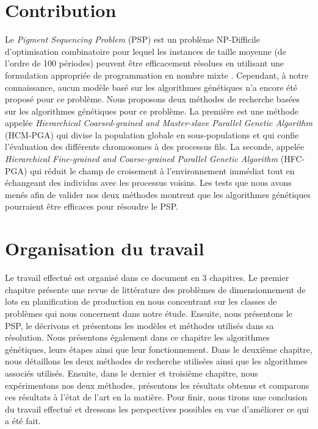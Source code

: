 	\section*{Contribution}
	Le \emph{Pigment Sequencing Problem} (PSP) est un problème NP-Difficile d'optimisation combinatoire pour lequel les instances de taille moyenne (de l'ordre de 100 périodes) peuvent être efficacement résolues en utilisant une formulation appropriée de programmation en nombre mixte \cite{pochet_wolsey}. Cependant, à notre connaissance, aucun modèle basé sur les algorithmes génétiques n'a encore été proposé pour ce problème. Nous proposons deux méthodes de recherche basées sur les algorithmes génétiques pour ce problème. La première est une méthode appelée \emph{Hierarchical Coarsed-grained and Master-slave Parallel Genetic Algorithm} (HCM-PGA) qui divise la population globale en sous-populations et qui confie l'évaluation des différents chromosomes à des processus fils. La seconde, appelée \emph{Hierarchical Fine-grained and Coarse-grained Parallel Genetic Algorithm} (HFC-PGA) qui réduit le champ de croisement à l'environnement immédiat tout en échangeant des individus avec les processus voisins. Les tests que nous avons menés afin de valider nos deux méthodes montrent que les algorithmes génétiques pourraient être efficaces pour résoudre le PSP. 
	 
	\section*{Organisation du travail}

	Le travail effectué est organisé dans ce document en 3 chapitres. Le premier chapitre présente une revue de littérature des problèmes de dimensionnement de lots en planification de production en nous concentrant sur les classes de problèmes qui nous concernent dans notre étude. Ensuite, nous présentons le PSP, le décrivons et présentons les modèles et méthodes utilisés dans sa résolution. Nous présentons également dans ce chapitre les algorithmes génétiques, leurs étapes ainsi que leur fonctionnement. Dans le deuxième chapitre, nous détaillons les deux méthodes de recherche utilisées ainsi que les algorithmes associés utilisés. Ensuite, dans le dernier et troisième chapitre, nous expérimentons  nos deux méthodes, présentons les résultats obtenus et comparons ces résultats à l'état de l'art en la matière. Pour finir, nous tirons une conclusion du travail effectué et dressons les perspectives possibles en vue d'améliorer ce qui a été fait.